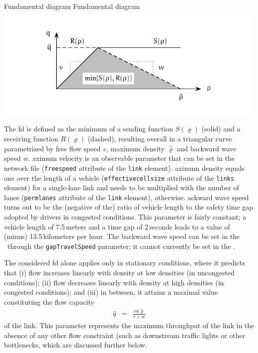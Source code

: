 \createfigure%
{Fundamental diagram}%
{Fundamental diagram}%
{\label{fig:Fundamental-diagram}}%
{\includegraphics[width=0.99\textwidth, angle=0]{understanding/figures/waves/fig0.pdf}}%
{}

The \gls{fd} is defined as the minimum of a sending function $S(\varrho)$
(solid) and a receiving function $R(\varrho)$ (dashed), resulting
overall in a triangular curve parametrized by free flow speed $v$, 
maximum density $\hat{\varrho}$ and 
backward wave speed $w$. aximum velocity is an observable
parameter that can be set in the network file (\lstinline{freespeed}
attribute of the \lstinline{link} element). aximum density equals
one over the length of a vehicle (\lstinline{effectivecellsize} attribute
of the \lstinline{links} element) for a single-lane link and needs to
be multiplied with the number of lanes (\lstinline{permlanes} attribute
of the \lstinline{link} element), otherwise. ackward wave speed
turns out to be the (negative of the) ratio of vehicle length to the safety time
gap adopted by drivers in congested conditions. This parameter 
is fairly constant; a vehicle length of 7.5\,meters and a time
gap of 2\,seconds leads to a value of (minus) 13.5\,kilometers per hour. 
The backward wave speed can be set in the \DOUBLEQUEUESIM\ through the
\lstinline|gapTravelSpeed| parameter; it cannot currently be set in the
\SINGLEQUEUESIM. 

The considered \gls{fd} alone applies only in stationary conditions, where
it predicts that (i) flow increases linearly with density at low densities
(\ie in uncongested conditions); (ii) flow decreases linearly with
density at high densities (\ie in congested conditions); and (iii)
in between, it attains a maximal value constituting the flow capacity
\begin{eqnarray}
\hat{q} & = & \frac{vw\hat{\varrho}}{v+w}\label{eq:flow-cap}
\end{eqnarray}
 of the link. This parameter represents the maximum throughput of
the link in the absence of any other flow constraint (such as downstream
traffic lights or other bottlenecks\corr{)}{}, which are discussed further
below\corr{}{)}.

